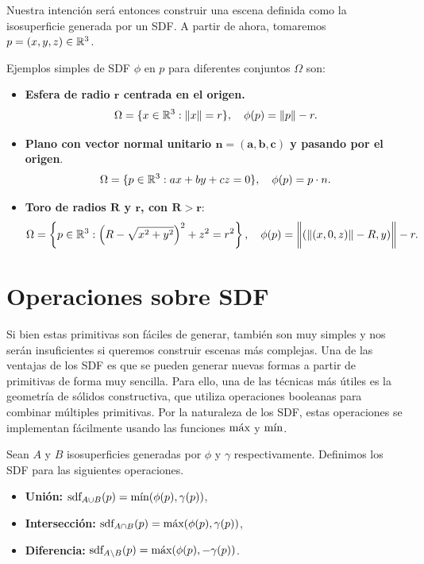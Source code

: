 Nuestra intención será entonces construir una escena definida como la isosuperficie generada por un SDF. A partir de ahora, tomaremos $p=(x,y,z)\in\R^3$.

\begin{ejemplo}
    Ejemplos simples de SDF $\phi$ en $p$ para diferentes conjuntos $\Omega$ son:
    \begin{itemize}
        \item \textbf{Esfera de radio $\boldsymbol{r}$ centrada en el origen.}
        \begin{equation*}
            \Omega=\{x\in \R^3 : \Vert x\Vert = r\},\quad \phi(p) = \Vert p\Vert - r.
        \end{equation*}
        \item \textbf{Plano con vector normal unitario $\boldsymbol{n=(a,b,c)}$ y pasando por el origen}.
        \begin{equation*}
            \Omega=\{p\in\R^3 : ax+by+cz = 0\},\quad \phi(p) = p\cdot n.
        \end{equation*}
        \item \textbf{Toro de radios $\boldsymbol{R}$ y $\boldsymbol{r}$, con $\boldsymbol{R>r}$}:
        \begin{equation*}
            \Omega=\left\{p\in \R^3 : \left(R-\sqrt{x^2+y^2}\right)^2 + z^2 = r^2\right\},\quad \phi(p)= \bigg\Vert (\Vert(x,0,z)\Vert - R, y) \bigg\Vert - r.
        \end{equation*}
    \end{itemize}
\end{ejemplo}


\section{Operaciones sobre SDF}
Si bien estas primitivas son fáciles de generar, también son muy simples y nos serán insuficientes si queremos construir escenas más complejas. Una de las ventajas de los SDF es que se pueden generar nuevas formas a partir de primitivas de forma muy sencilla. Para ello, una de las técnicas más útiles es la geometría de sólidos constructiva, que utiliza operaciones booleanas para combinar múltiples primitivas. Por la naturaleza de los SDF, estas operaciones se implementan fácilmente usando las funciones $\Max$ y $\Min$.

\begin{definicion}\label{p:boolean}
    Sean $A$ y $B$ isosuperficies generadas por $\phi$ y $\gamma$ respectivamente. Definimos los SDF para las siguientes operaciones.
    \begin{itemize}
        \item \textbf{Unión: } $\sdf_{A\cup B}(p) = \Min(\phi(p), \gamma(p))$,
        \item \textbf{Intersección: } $\sdf_{A\cap B}(p) = \Max(\phi(p), \gamma(p))$,
        \item \textbf{Diferencia: } $\sdf_{A\setminus B}(p) = \Max(\phi(p), -\gamma(p))$.
    \end{itemize}
\end{definicion}

